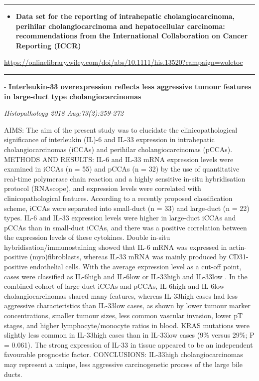 \documentclass[]{article}
\providecommand{\tightlist}{%
  \setlength{\itemsep}{0pt}\setlength{\parskip}{0pt}}
\begin{document}
\begin{center}\rule{0.5\linewidth}{\linethickness}\end{center}

\begin{itemize}
\tightlist
\item
  \textbf{Data set for the reporting of intrahepatic cholangiocarcinoma,
  perihilar cholangiocarcinoma and hepatocellular carcinoma:
  recommendations from the International Collaboration on Cancer
  Reporting (ICCR)}
\end{itemize}

\url{https://onlinelibrary.wiley.com/doi/abs/10.1111/his.13520?campaign=woletoc}

\begin{center}\rule{0.5\linewidth}{\linethickness}\end{center}

 - \textbf{Interleukin-33 overexpression reflects less aggressive tumour
features in large-duct type cholangiocarcinomas}

\emph{Histopathology 2018 Aug;73(2):259-272}

AIMS: The aim of the present study was to elucidate the
clinicopathological significance of interleukin (IL)-6 and IL-33
expression in intrahepatic cholangiocarcinomas (iCCAs) and perihilar
cholangiocarcinomas (pCCAs). METHODS AND RESULTS: IL-6 and IL-33 mRNA
expression levels were examined in iCCAs (n = 55) and pCCAs (n = 32) by
the use of quantitative real-time polymerase chain reaction and a highly
sensitive in-situ hybridisation protocol (RNAscope), and expression
levels were correlated with clinicopathological features. According to a
recently proposed classification scheme, iCCAs were separated into
small-duct (n = 33) and large-duct (n = 22) types. IL-6 and IL-33
expression levels were higher in large-duct iCCAs and pCCAs than in
small-duct iCCAs, and there was a positive correlation between the
expression levels of these cytokines. Double in-situ
hybridisation/immunostaining showed that IL-6 mRNA was expressed in
actin-positive (myo)fibroblasts, whereas IL-33 mRNA was mainly produced
by CD31-positive endothelial cells. With the average expression level as
a cut-off point, cases were classified as IL-6high and IL-6low or
IL-33high and IL-33low . In the combined cohort of large-duct iCCAs and
pCCAs, IL-6high and IL-6low cholangiocarcinomas shared many features,
whereas IL-33high cases had less aggressive characteristics than
IL-33low cases, as shown by lower tumour marker concentrations, smaller
tumour sizes, less common vascular invasion, lower pT stages, and higher
lymphocyte/monocyte ratios in blood. KRAS mutations were slightly less
common in IL-33high cases than in IL-33low cases (9\% versus 29\%; P =
0.061). The strong expression of IL-33 in tissue appeared to be an
independent favourable prognostic factor. CONCLUSIONS: IL-33high
cholangiocarcinomas may represent a unique, less aggressive
carcinogenetic process of the large bile ducts.
\end{document}
